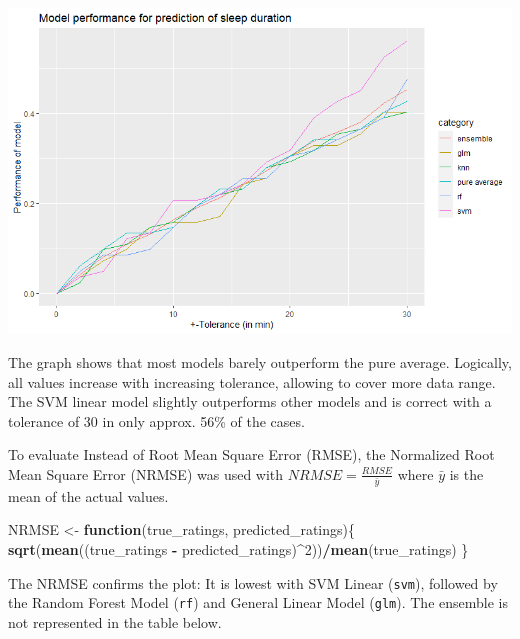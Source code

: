 \documentclass[
]{article}
\newenvironment{Shaded}{\begin{snugshade}}{\end{snugshade}}
\newcommand{\ControlFlowTok}[1]{\textcolor[rgb]{0.13,0.29,0.53}{\textbf{#1}}}
\newcommand{\DecValTok}[1]{\textcolor[rgb]{0.00,0.00,0.81}{#1}}
\newcommand{\KeywordTok}[1]{\textcolor[rgb]{0.13,0.29,0.53}{\textbf{#1}}}
\newcommand{\NormalTok}[1]{#1}
\newcommand{\OperatorTok}[1]{\textcolor[rgb]{0.81,0.36,0.00}{\textbf{#1}}}
\newcommand{\StringTok}[1]{\textcolor[rgb]{0.31,0.60,0.02}{#1}}
\begin{document}
\includegraphics{./4c54cac10838a095c48f2a179f2d9d8f708daa17.png}

The graph shows that most models barely outperform the pure average.
Logically, all values increase with increasing tolerance, allowing to
cover more data range. The SVM linear model slightly outperforms other
models and is correct with a tolerance of 30 in only approx. 56\% of the
cases.

To evaluate Instead of Root Mean Square Error (RMSE), the Normalized
Root Mean Square Error (NRMSE) was used with
\(NRMSE=\frac{RMSE}{\bar{y}}\) where \(\bar{y}\) is the mean of the
actual values.

\begin{Shaded}
\begin{Highlighting}[]
\NormalTok{NRMSE <-}\StringTok{ }\ControlFlowTok{function}\NormalTok{(true_ratings, predicted_ratings)\{}
  \KeywordTok{sqrt}\NormalTok{(}\KeywordTok{mean}\NormalTok{((true_ratings }\OperatorTok{-}\StringTok{ }\NormalTok{predicted_ratings)}\OperatorTok{^}\DecValTok{2}\NormalTok{))}\OperatorTok{/}\KeywordTok{mean}\NormalTok{(true_ratings)}
\NormalTok{\}}
\end{Highlighting}
\end{Shaded}

The NRMSE confirms the plot: It is lowest with SVM Linear
(\texttt{svm}), followed by the Random Forest Model (\texttt{rf}) and
General Linear Model (\texttt{glm}). The ensemble is not represented in
the table below.
\end{document}
